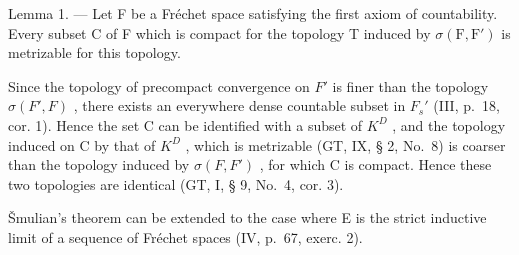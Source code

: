 Lemma 1. --- Let F be a Fréchet space satisfying the first axiom of countability. Every subset C of F which is compact for the topology T induced by \(\sigma(\mathrm{F},\mathrm{F}')\) is metrizable for this topology.

Since the topology of precompact convergence on \(F'\) is finer than the topology \(\sigma(F', F)\) , there exists an everywhere dense countable subset in \(F_{s}'\) (III, p.~18, cor. 1). Hence the set C can be identified with a subset of \(K^{D}\) , and the topology induced on C by that of \(K^{D}\) , which is metrizable (GT, IX, § 2, No.~8) is coarser than the topology induced by \(\sigma(F, F')\) , for which C is compact. Hence these two topologies are identical (GT, I, § 9, No.~4, cor. 3).

Šmulian's theorem can be extended to the case where E is the strict inductive limit of a sequence of Fréchet spaces (IV, p.~67, exerc. 2).

